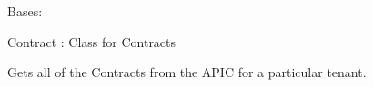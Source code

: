 \documentclass[letterpaper,10pt,english]{sphinxmanual}
\begin{document}
\begin{fulllineitems}
\label{acitoolkit:acitoolkit.Contract}
Bases: {\hyperref[acitoolkit:acitoolkit.BaseContract]{}}

Contract :  Class for Contracts

\begin{fulllineitems}
\label{acitoolkit:acitoolkit.Contract.get}
Gets all of the Contracts from the APIC for a particular tenant.

\end{fulllineitems}


\end{fulllineitems}

\end{document}
